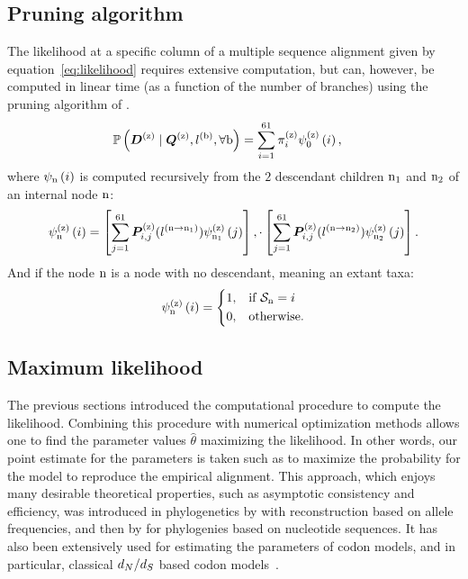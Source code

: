 \subsection{Pruning algorithm}
\label{subsec:pruning-algorithm}
The likelihood at a specific column of a multiple sequence alignment given by equation~\ref{eq:likelihood} requires extensive computation, but can, however, be computed in linear time (as a function of the number of branches) using the pruning algorithm of \citet{Felsenstein1981}.
\begin{align}
    \mathbb{P} \left(\bm{D}^{(\text{z})} \mid \bm{Q}^{(\text{z})}, l^{(\text{b})}, \forall \text{b} \right) & = \sum\limits_{{i}=1}^{61} \pi^{(\text{z})}_{{i}} \psi^{(\text{z})}_{0} \left( {i} \right),
\end{align}
where $\psi_{\text{n}} \left( {i} \right)$ is computed recursively from the $2$ descendant children $\text{n}_{1}$ and $\text{n}_{2}$ of an internal node $\text{n}$:
\begin{align}
    \psi^{(\text{z})}_{\text{n}} \left( {i} \right) =
    \left[ \sum\limits_{{j}=1}^{61}\bm{P}^{(\text{z})}_{{i}, {j}}(l^{(\text{n} \to \text{n}_{1})}) \psi^{(\text{z})}_{\text{n}_{1}} \left( {j} \right) \right],
    \cdot
    \left[ \sum\limits_{{j}=1}^{61}\bm{P}^{(\text{z})}_{{i}, {j}}(l^{(\text{n} \to \text{n}_{2})}) \psi^{(\text{z})}_{\text{n}_{2}} \left( {j} \right) \right].
\end{align}
And if the node $\text{n}$ is a node with no descendant, meaning an extant taxa:
\begin{align}
    \psi^{(\text{z})}_{\text{n}} \left( {i} \right) =
    \begin{dcases}
        1, & \text{if } \mathcal{S}_{\text{n}} = {i} \\
        0, & \text{otherwise.}
    \end{dcases}
\end{align}

\subsection{Maximum likelihood}
\label{subsec:maximum-likelihood}

The previous sections introduced the computational procedure to compute the likelihood.
Combining this procedure with numerical optimization methods allows one to find the parameter values $\widehat{\theta}$ maximizing the likelihood.
In other words, our point estimate for the parameters is taken such as to maximize the probability for the model to reproduce the empirical alignment.
This approach, which enjoys many desirable theoretical properties, such as asymptotic consistency and efficiency, was introduced in phylogenetics by \citet{Cavalli-Sforza1967} with reconstruction based on allele frequencies, and then by \citet{Felsenstein1981} for phylogenies based on nucleotide sequences.
It has also been extensively used for estimating the parameters of codon models, and in particular, classical $d_N / d_S$ based codon models~\citep{Yang1997a,Pond2005,Dutheil2006,Yang2007,Gueguen2013,KosakovskyPond2020}.



